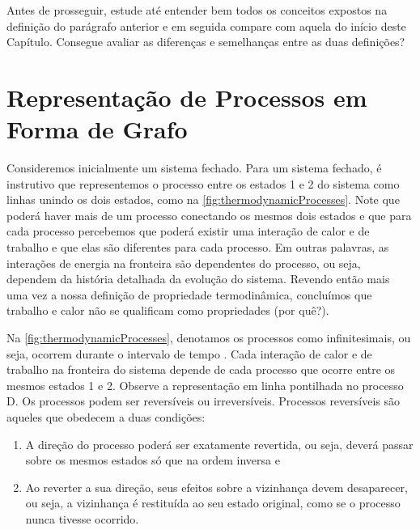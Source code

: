     Antes de prosseguir, estude até entender bem todos os conceitos expostos na
    definição do parágrafo anterior e em seguida compare com aquela do início
    deste Capítulo. Consegue avaliar as diferenças e semelhanças entre as duas
    definições?


    \section{Representação de Processos em Forma de Grafo}

    Consideremos inicialmente um sistema fechado. Para um sistema fechado, é
    instrutivo que representemos o processo entre os estados 1 e 2 do sistema
    como linhas unindo os dois estados, como na
    \cref{fig:thermodynamicProcesses}. Note que poderá haver mais de um
    processo conectando os mesmos dois estados e que para cada processo
    percebemos que poderá existir uma interação de calor e de trabalho e que
    elas são diferentes para cada processo. Em outras palavras, as interações
    de energia na fronteira são dependentes do processo, ou seja, dependem da
    história detalhada da evolução do sistema. Revendo então mais uma vez a
    nossa definição de propriedade termodinâmica, concluímos que trabalho e
    calor não se qualificam como propriedades (por quê?).

    Na \cref{fig:thermodynamicProcesses}, denotamos os processos como
    infinitesimais, ou seja, ocorrem durante o intervalo de tempo
    . Cada interação de calor  e de
    trabalho  na fronteira do sistema depende de cada
    processo que ocorre entre os mesmos estados 1 e 2. Observe a representação
    em linha pontilhada no processo D.  Os processos podem ser reversíveis ou
    irreversíveis. Processos reversíveis são aqueles que obedecem a duas
    condições:

    \begin{enumerate}
        \item A direção do processo poderá ser exatamente revertida, ou seja,
            deverá passar sobre os mesmos estados só que na ordem inversa e

        \item Ao reverter a sua direção, seus efeitos sobre a vizinhança devem
            desaparecer, ou seja, a vizinhança é restituída ao seu estado
            original, como se o processo nunca tivesse ocorrido.
    \end{enumerate}

